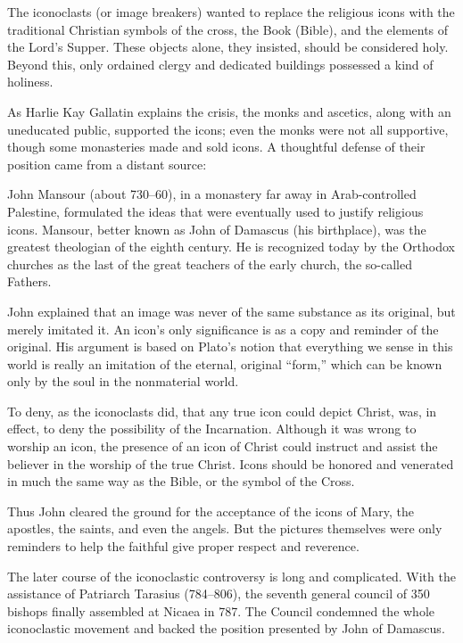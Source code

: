 The iconoclasts (or image breakers) wanted to replace the religious icons with the traditional
Christian symbols of the cross, the Book (Bible), and the elements of the Lord’s Supper. These
objects alone, they insisted, should be considered holy. Beyond this, only ordained clergy and
dedicated buildings possessed a kind of holiness.

As Harlie Kay Gallatin explains the crisis, the monks and ascetics, along with an uneducated public,
supported the icons; even the monks were not all supportive, though some monasteries made and sold
icons. A thoughtful defense of their position came from a distant source:

\begin{blockquote}
John Mansour (about 730–60), in a monastery far away in Arab-controlled Palestine, formulated the
ideas that were eventually used to justify religious icons. Mansour, better known as John of
Damascus (his birthplace), was the greatest theologian of the eighth century. He is recognized today
by the Orthodox churches as the last of the great teachers of the early church, the so-called
Fathers.

John explained that an image was never of the same substance as its original, but merely imitated
it. An icon’s only significance is as a copy and reminder of the original. His argument is based on
Plato’s notion that everything we sense in this world is really an imitation of the eternal,
original “form,” which can be known only by the soul in the nonmaterial world.

To deny, as the iconoclasts did, that any true icon could depict Christ, was, in effect, to deny the
possibility of the Incarnation. Although it was wrong to worship an icon, the presence of an icon of
Christ could instruct and assist the believer in the worship of the true Christ. Icons should be
honored and venerated in much the same way as the Bible, or the symbol of the Cross.
\end{blockquote}

Thus John cleared the ground for the acceptance of the icons of Mary, the apostles, the saints, and
even the angels. But the pictures themselves were only reminders to help the faithful give proper
respect and reverence.

The later course of the iconoclastic controversy is long and complicated. With the assistance of
Patriarch Tarasius (784–806), the seventh general council of 350 bishops finally assembled at Nicaea
in 787. The Council condemned the whole iconoclastic movement and backed the position presented by
John of Damascus.

